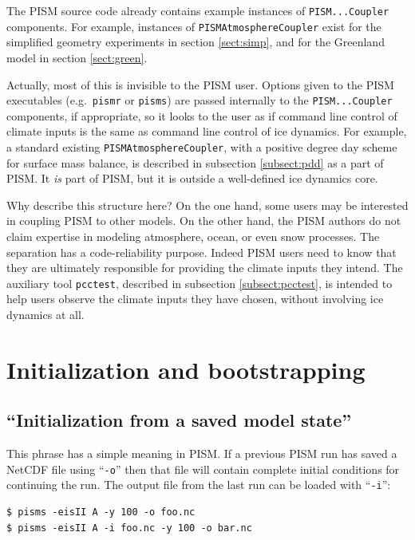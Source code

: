 \documentclass[11pt,final]{amsart}
\renewcommand{\t}[1]{\texttt{#1}}
\newcommand{\pismoptionindex}[1]{\index{options for PISM (and PETSc)!\texttt{-#1}}}
\newcommand{\intextoption}[1]{\texttt{-#1}\pismoptionindex{#1}}
\begin{document}
The PISM source code already contains example instances of \t{PISM...Coupler} components.  For example, instances of \t{PISMAtmosphereCoupler} exist for the simplified geometry experiments in section \ref{sect:simp}, and for the Greenland model in section \ref{sect:green}.

Actually, most of this is invisible to the PISM user.  Options given to the PISM executables (e.g.~\t{pismr} or \t{pisms}) are passed internally to the \t{PISM...Coupler} components, if appropriate, so it looks to the user as if command line control of climate inputs is the same as command line control of ice dynamics.  For example, a standard existing \t{PISMAtmosphereCoupler}, with a positive degree day scheme for surface mass balance, is described in subsection \ref{subsect:pdd} as a part of PISM.  It \emph{is} part of PISM, but it is outside a well-defined ice dynamics core.

Why describe this structure here?  On the one hand, some users may be interested in coupling PISM to other models.  On the other hand, the PISM authors do not claim expertise in modeling atmosphere, ocean, or even snow processes.  The separation has a code-reliability purpose.  Indeed PISM users need to know that they are ultimately responsible for providing the climate inputs they intend.  The auxiliary tool \verb|pcctest|, described in subsection \ref{subsect:pcctest}, is intended to help users observe the climate inputs they have chosen, without involving ice dynamics at all.


\clearpage
\newpage
\section{Initialization and bootstrapping}\label{sect:boot}  

\subsection{``Initialization from a saved model state''}  This phrase has a simple meaning in PISM.  If a previous PISM run has saved a NetCDF file using ``\verb|-o|'' then that file will contain complete initial conditions for continuing the run.  The output file from the last run can be loaded with ``\intextoption{i}'':

\begin{verbatim}
$ pisms -eisII A -y 100 -o foo.nc
$ pisms -eisII A -i foo.nc -y 100 -o bar.nc
\end{verbatim}
\smallskip
\end{document}
